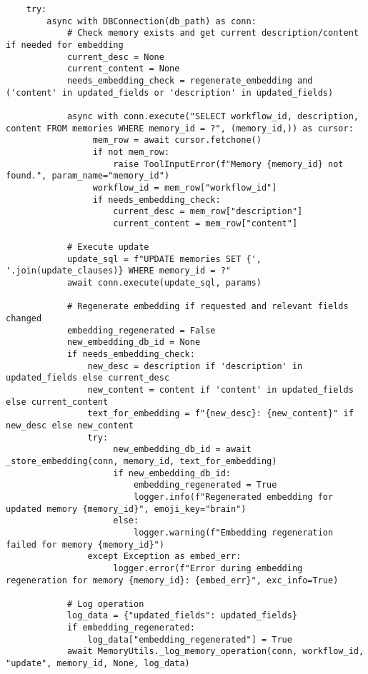 \documentclass[12pt,a4paper]{article}
\begin{document}
\begin{pageablecode}
\begin{verbatim}
    try:
        async with DBConnection(db_path) as conn:
            # Check memory exists and get current description/content if needed for embedding
            current_desc = None
            current_content = None
            needs_embedding_check = regenerate_embedding and ('content' in updated_fields or 'description' in updated_fields)

            async with conn.execute("SELECT workflow_id, description, content FROM memories WHERE memory_id = ?", (memory_id,)) as cursor:
                 mem_row = await cursor.fetchone()
                 if not mem_row: 
                     raise ToolInputError(f"Memory {memory_id} not found.", param_name="memory_id")
                 workflow_id = mem_row["workflow_id"]
                 if needs_embedding_check:
                     current_desc = mem_row["description"]
                     current_content = mem_row["content"]

            # Execute update
            update_sql = f"UPDATE memories SET {', '.join(update_clauses)} WHERE memory_id = ?"
            await conn.execute(update_sql, params)

            # Regenerate embedding if requested and relevant fields changed
            embedding_regenerated = False
            new_embedding_db_id = None
            if needs_embedding_check:
                new_desc = description if 'description' in updated_fields else current_desc
                new_content = content if 'content' in updated_fields else current_content
                text_for_embedding = f"{new_desc}: {new_content}" if new_desc else new_content
                try:
                     new_embedding_db_id = await _store_embedding(conn, memory_id, text_for_embedding)
                     if new_embedding_db_id:
                         embedding_regenerated = True
                         logger.info(f"Regenerated embedding for updated memory {memory_id}", emoji_key="brain")
                     else:
                         logger.warning(f"Embedding regeneration failed for memory {memory_id}")
                except Exception as embed_err:
                     logger.error(f"Error during embedding regeneration for memory {memory_id}: {embed_err}", exc_info=True)

            # Log operation
            log_data = {"updated_fields": updated_fields}
            if embedding_regenerated: 
                log_data["embedding_regenerated"] = True
            await MemoryUtils._log_memory_operation(conn, workflow_id, "update", memory_id, None, log_data)


\end{verbatim}
\end{pageablecode}
\end{document}
